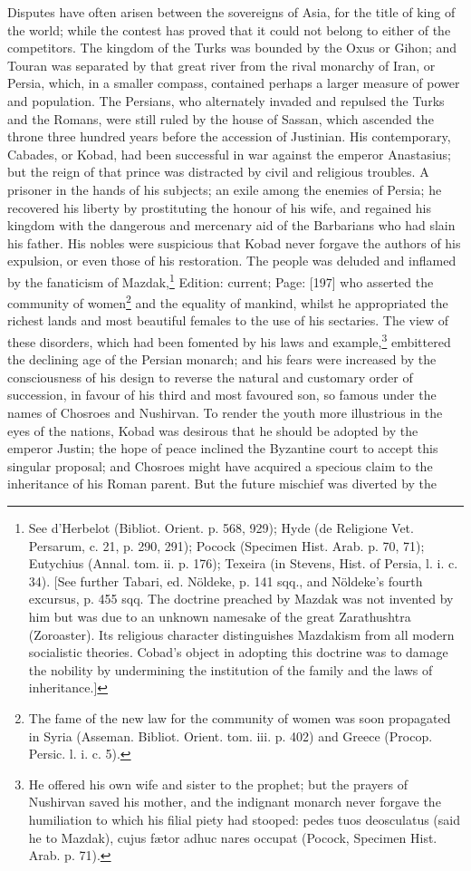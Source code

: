 Disputes have often arisen between the sovereigns of Asia, for the title of king of the world; while the contest has proved that it could not belong to either of the competitors. The kingdom of the Turks was bounded by the Oxus or Gihon; and Touran was separated by that great river from the rival monarchy of Iran, or Persia, which, in a smaller compass, contained perhaps a larger measure of power and population. The Persians, who alternately invaded and repulsed the Turks and the Romans, were still ruled by the house of Sassan, which ascended the throne three hundred years before the accession of Justinian. His contemporary, Cabades, or Kobad, had been successful in war against the emperor Anastasius; but the reign of that prince was distracted by civil and religious troubles. A prisoner in the hands of his subjects; an exile among the enemies of Persia; he recovered his liberty by prostituting the honour of his wife, and regained his kingdom with the dangerous and mercenary aid of the Barbarians who had slain his father. His nobles were suspicious that Kobad never forgave the authors of his expulsion, or even those of his restoration. The people was deluded and inflamed by the fanaticism of Mazdak,\footnote{See d\texthebrew{}’Herbelot (Bibliot. Orient. p. 568, 929); Hyde (de Religione Vet. Persarum, c. 21, p. 290, 291); Pocock (Specimen Hist. Arab. p. 70, 71); Eutychius (Annal. tom. ii. p. 176); Texeira (in Stevens, Hist. of Persia, l. i. c. 34). [See further Tabari, ed. Nöldeke, p. 141 sqq., and Nöldeke\texthebrew{}’s fourth excursus, p. 455 sqq. The doctrine preached by Mazdak was not invented by him but was due to an unknown namesake of the great Zarathushtra (Zoroaster). Its religious character distinguishes Mazdakism from all modern socialistic theories. Cobad\texthebrew{}’s object in adopting this doctrine was to damage the nobility by undermining the institution of the family and the laws of inheritance.]} Edition: current; Page: [197] who asserted the community of women\footnote{The fame of the new law for the community of women was soon propagated in Syria (Asseman. Bibliot. Orient. tom. iii. p. 402) and Greece (Procop. Persic. l. i. c. 5).} and the equality of mankind, whilst he appropriated the richest lands and most beautiful females to the use of his sectaries. The view of these disorders, which had been fomented by his laws and example,\footnote{He offered his own wife and sister to the prophet; but the prayers of Nushirvan saved his mother, and the indignant monarch never forgave the humiliation to which his filial piety had stooped: pedes tuos deosculatus (said he to Mazdak), cujus fætor adhuc nares occupat (Pocock, Specimen Hist. Arab. p. 71).} embittered the declining age of the Persian monarch; and his fears were increased by the consciousness of his design to reverse the natural and customary order of succession, in favour of his third and most favoured son, so famous under the names of Chosroes and Nushirvan. To render the youth more illustrious in the eyes of the nations, Kobad was desirous that he should be adopted by the emperor Justin; the hope of peace inclined the Byzantine court to accept this singular proposal; and Chosroes might have acquired a specious claim to the inheritance of his Roman parent. But the future mischief was diverted by the 